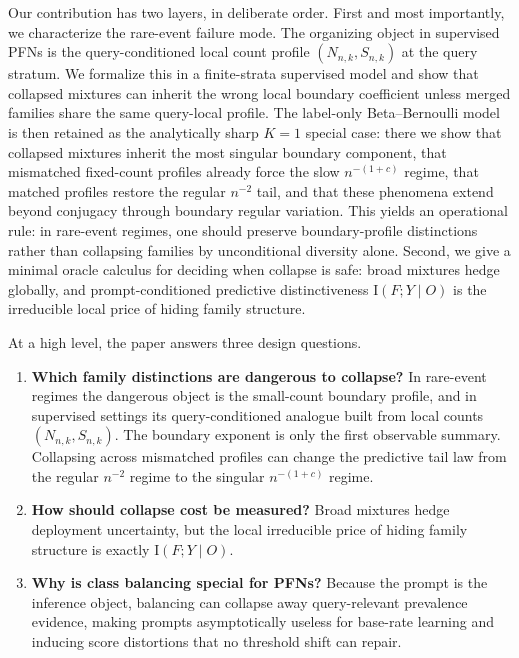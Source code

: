 \documentclass{article}
\theoremstyle{definition}
\theoremstyle{remark}
\newcommand{\I}{\mathrm{I}}
\begin{document}
Our contribution has two layers, in deliberate order. First and most importantly, we characterize the rare-event failure mode. The organizing object in supervised PFNs is the query-conditioned local count profile $(N_{n,k},S_{n,k})$ at the query stratum. We formalize this in a finite-strata supervised model and show that collapsed mixtures can inherit the wrong local boundary coefficient unless merged families share the same query-local profile. The label-only Beta--Bernoulli model is then retained as the analytically sharp $K=1$ special case: there we show that collapsed mixtures inherit the most singular boundary component, that mismatched fixed-count profiles already force the slow $n^{-(1+c)}$ regime, that matched profiles restore the regular $n^{-2}$ tail, and that these phenomena extend beyond conjugacy through boundary regular variation. This yields an operational rule: in rare-event regimes, one should preserve boundary-profile distinctions rather than collapsing families by unconditional diversity alone. Second, we give a minimal oracle calculus for deciding when collapse is safe: broad mixtures hedge globally, and prompt-conditioned predictive distinctiveness $\I(F;Y\mid O)$ is the irreducible local price of hiding family structure.

At a high level, the paper answers three design questions.
\begin{enumerate}[leftmargin=18pt]
\item \textbf{Which family distinctions are dangerous to collapse?} In rare-event regimes the dangerous object is the small-count boundary profile, and in supervised settings its query-conditioned analogue built from local counts $(N_{n,k},S_{n,k})$. The boundary exponent is only the first observable summary. Collapsing across mismatched profiles can change the predictive tail law from the regular $n^{-2}$ regime to the singular $n^{-(1+c)}$ regime.
\item \textbf{How should collapse cost be measured?} Broad mixtures hedge deployment uncertainty, but the local irreducible price of hiding family structure is exactly $\I(F;Y\mid O)$.
\item \textbf{Why is class balancing special for PFNs?} Because the prompt is the inference object, balancing can collapse away query-relevant prevalence evidence, making prompts asymptotically useless for base-rate learning and inducing score distortions that no threshold shift can repair.
\end{enumerate}
\end{document}
